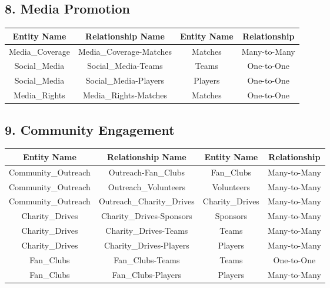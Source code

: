 \documentclass[a4paper, 12pt]{article}
\begin{document}
\subsection{8. Media Promotion}
\begin{tabular}{|C|C|C|C|}
\hline
    \textbf{Entity Name} &\textbf{Relationship Name} & \textbf{Entity Name} & \textbf{Relationship}\\\hline
         Media\_Coverage & Media\_Coverage-Matches & Matches & Many-to-Many\\\hline
         Social\_Media & Social\_Media-Teams & Teams & One-to-One\\\hline
         Social\_Media & Social\_Media-Players & Players & One-to-One\\\hline
         Media\_Rights & Media\_Rights-Matches & Matches & One-to-One\\
\hline
\end{tabular}
\newline
\subsection{9. Community Engagement}
\begin{tabular}{|C|C|C|C|}
\hline
    \textbf{Entity Name} &\textbf{Relationship Name} & \textbf{Entity Name} & \textbf{Relationship}\\\hline
         Community\_Outreach & Outreach-Fan\_Clubs & Fan\_Clubs & Many-to-Many\\\hline
         Community\_Outreach & Outreach\_Volunteers & Volunteers & Many-to-Many\\\hline
         Community\_Outreach & Outreach\_Charity\_Drives & Charity\_Drives & Many-to-Many\\\hline
         Charity\_Drives & Charity\_Drives-Sponsors & Sponsors & Many-to-Many\\\hline
         Charity\_Drives & Charity\_Drives-Teams & Teams & Many-to-Many\\\hline
         Charity\_Drives & Charity\_Drives-Players & Players & Many-to-Many\\\hline
         Fan\_Clubs & Fan\_Clubs-Teams & Teams & One-to-One\\\hline
         Fan\_Clubs & Fan\_Clubs-Players & Players & Many-to-Many\\
\hline
\end{tabular}
\end{document}
